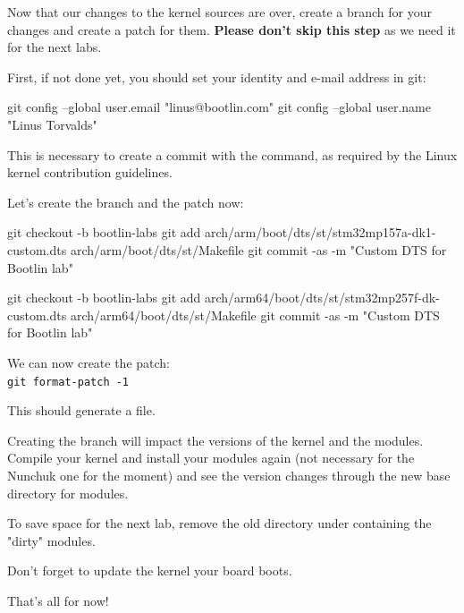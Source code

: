 Now that our changes to the kernel sources are over,
create a branch for your changes and create a patch for them.
{\bf Please don't skip this step} as we need it for the next labs.

First, if not done yet, you should set your identity
and e-mail address in git:

\begin{bashinput}
git config --global user.email "linus@bootlin.com"
git config --global user.name "Linus Torvalds"
\end{bashinput}

This is necessary to create a commit with the 
command, as required by the Linux kernel contribution guidelines.

Let's create the branch and the patch now:

\if{}
\begin{bashinput}
git checkout -b bootlin-labs
git add arch/arm/boot/dts/st/stm32mp157a-dk1-custom.dts arch/arm/boot/dts/st/Makefile
git commit -as -m "Custom DTS for Bootlin lab"
\end{bashinput}
\fi
\if{}
\begin{bashinput}
git checkout -b bootlin-labs
git add arch/arm64/boot/dts/st/stm32mp257f-dk-custom.dts arch/arm64/boot/dts/st/Makefile
git commit -as -m "Custom DTS for Bootlin lab"
\end{bashinput}
\fi

We can now create the patch:\\
\texttt{git format-patch -1}

This should generate a 
file.

Creating the branch will impact the versions of the kernel and the modules.
Compile your kernel and install your modules again (not necessary for the
Nunchuk one for the moment) and see the version changes through the
new base directory for modules.

To save space for the next lab, remove the old directory under
 containing the "dirty" modules.

Don't forget to update the kernel your board boots.

That's all for now!
